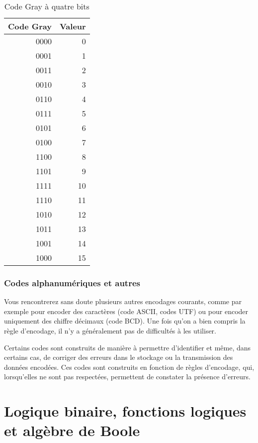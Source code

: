 \documentclass[11pt]{article}
\begin{document}
\begin{table}[htbp]
\caption{\label{tab:org09a91b5}Code Gray à quatre bits}
\centering
\begin{tabular}{rr}
Code Gray & Valeur\\
\hline
0000 & 0\\
0001 & 1\\
0011 & 2\\
0010 & 3\\
0110 & 4\\
0111 & 5\\
0101 & 6\\
0100 & 7\\
1100 & 8\\
1101 & 9\\
1111 & 10\\
1110 & 11\\
1010 & 12\\
1011 & 13\\
1001 & 14\\
1000 & 15\\
\end{tabular}
\end{table}


\subsubsection{Codes alphanumériques et autres}
\label{sec:orge279130}

Vous rencontrerez sans doute plusieurs autres encodages courants,
comme par exemple pour encoder des caractères (code ASCII, codes UTF)
ou pour encoder uniquement des chiffre décimaux (code BCD). Une fois
qu'on a bien compris la règle d'encodage, il n'y a généralement pas de
difficultés à les utiliser.

Certains codes sont construits de manière à permettre d’identifier et
même, dans certains cas, de corriger des erreurs dans le stockage ou
la transmission des données encodées. Ces codes sont construits en
fonction de règles d'encodage, qui, lorsqu'elles ne sont pas
respectées, permettent de constater la présence d'erreurs.

\section{Logique binaire, fonctions logiques et algèbre de Boole}
\label{sec:org3b2c305}
\end{document}
